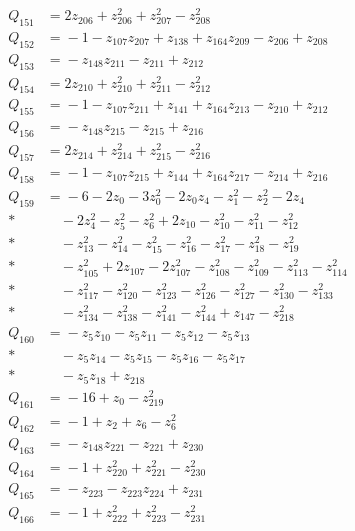 \begin{align*}
Q_{151} &={}2z_{206} + z_{206}^{2} + z_{207}^{2} - z_{208}^{2}\\[4pt]
Q_{152} &={}-1 - z_{107}z_{207} + z_{138} + z_{164}z_{209} - z_{206} + z_{208}\\[4pt]
Q_{153} &={}-z_{148}z_{211} - z_{211} + z_{212}\\[4pt]
Q_{154} &={}2z_{210} + z_{210}^{2} + z_{211}^{2} - z_{212}^{2}\\[4pt]
Q_{155} &={}-1 - z_{107}z_{211} + z_{141} + z_{164}z_{213} - z_{210} + z_{212}\\[4pt]
Q_{156} &={}-z_{148}z_{215} - z_{215} + z_{216}\\[4pt]
Q_{157} &={}2z_{214} + z_{214}^{2} + z_{215}^{2} - z_{216}^{2}\\[4pt]
Q_{158} &={}-1 - z_{107}z_{215} + z_{144} + z_{164}z_{217} - z_{214} + z_{216}\\[4pt]
Q_{159} &={}-6 - 2z_{0} - 3z_{0}^{2} - 2z_{0}z_{4} - z_{1}^{2} - z_{2}^{2} - 2z_{4}\\*
&\quad{} - 2z_{4}^{2} - z_{5}^{2} - z_{6}^{2} + 2z_{10} - z_{10}^{2} - z_{11}^{2} - z_{12}^{2}\\*
&\quad{} - z_{13}^{2} - z_{14}^{2} - z_{15}^{2} - z_{16}^{2} - z_{17}^{2} - z_{18}^{2} - z_{19}^{2}\\*
&\quad{} - z_{105}^{2} + 2z_{107} - 2z_{107}^{2} - z_{108}^{2} - z_{109}^{2} - z_{113}^{2} - z_{114}^{2}\\*
&\quad{} - z_{117}^{2} - z_{120}^{2} - z_{123}^{2} - z_{126}^{2} - z_{127}^{2} - z_{130}^{2} - z_{133}^{2}\\*
&\quad{} - z_{134}^{2} - z_{138}^{2} - z_{141}^{2} - z_{144}^{2} + z_{147} - z_{218}^{2}\\[4pt]
Q_{160} &={}-z_{5}z_{10} - z_{5}z_{11} - z_{5}z_{12} - z_{5}z_{13}\\*
&\quad{} - z_{5}z_{14} - z_{5}z_{15} - z_{5}z_{16} - z_{5}z_{17}\\*
&\quad{} - z_{5}z_{18} + z_{218}\\[4pt]
Q_{161} &={}-16 + z_{0} - z_{219}^{2}\\[4pt]
Q_{162} &={}-1 + z_{2} + z_{6} - z_{6}^{2}\\[4pt]
Q_{163} &={}-z_{148}z_{221} - z_{221} + z_{230}\\[4pt]
Q_{164} &={}-1 + z_{220}^{2} + z_{221}^{2} - z_{230}^{2}\\[4pt]
Q_{165} &={}-z_{223} - z_{223}z_{224} + z_{231}\\[4pt]
Q_{166} &={}-1 + z_{222}^{2} + z_{223}^{2} - z_{231}^{2}\\[4pt]

\end{align*}
